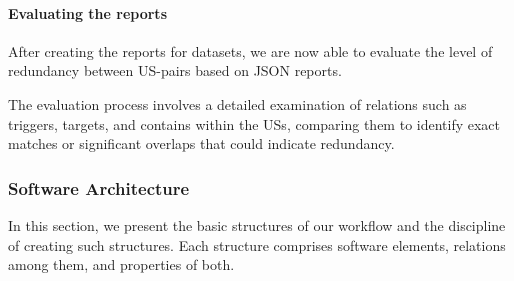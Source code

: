 \paragraph{Evaluating the reports} After creating the reports for datasets, we are now able to evaluate the level of redundancy between US-pairs based on JSON reports.

The evaluation process involves a detailed examination of relations such as triggers, targets, and contains within the USs, comparing them to identify exact matches or significant overlaps that could indicate redundancy.

\subsubsection*{Software Architecture}\label{architectur}
In this section, we present the basic structures of our workflow and the discipline of creating such structures. Each structure comprises software elements, relations among them, and properties of both.
